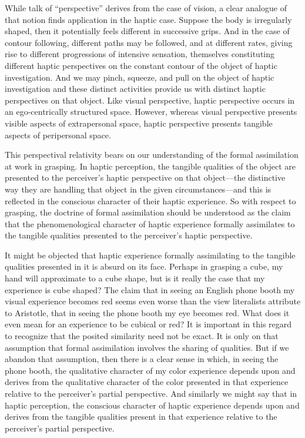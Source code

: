 \documentclass[12pt]{article}
\begin{document}
While talk of ``perspective'' derives from the case of vision, a clear analogue of that notion finds application in the haptic case. Suppose the body is irregularly shaped, then it potentially feels different in successive grips. And in the case of contour following, different paths may be followed, and at different rates, giving rise to different progressions of intensive sensation, themselves constituting different haptic perspectives on the constant contour of the object of haptic investigation. And we may pinch, squeeze, and pull on the object of haptic investigation and these distinct activities provide us with distinct haptic perspectives on that object. Like visual perspective, haptic perspective occurs in an ego-centrically structured space. However, whereas visual perspective presents visible aspects of extrapersonal space, haptic perspective presents tangible aspects of peripersonal space.

This perspectival relativity bears on our understanding of the formal assimilation at work in grasping. In haptic perception, the tangible qualities of the object are presented to the perceiver's haptic perspective on that object---the distinctive way they are handling that object in the given circumstances---and this is reflected in the conscious character of their haptic experience. So with respect to grasping, the doctrine of formal assimilation should be understood as the claim that the phenomenological character of haptic experience formally assimilates to the tangible qualities presented to the perceiver's haptic perspective. 

It might be objected that haptic experience formally assimilating to the tangible qualities presented in it is absurd on its face. Perhaps in grasping a cube, my hand will approximate to a cube shape, but is it really the case that my experience is cube shaped? The claim that in seeing an English phone booth my visual experience becomes red seems even worse than the view literalists attribute to Aristotle, that in seeing the phone booth my eye becomes red. What does it even mean for an experience to be cubical or red? It is important in this regard to recognize that the posited similarity need not be exact. It is only on that assumption that formal assimilation involves the sharing of qualities. But if we abandon that assumption, then there is a clear sense in which, in seeing the phone booth, the qualitative character of my color experience depends upon and derives from the qualitative character of the color presented in that experience relative to the perceiver's partial perspective. And similarly we might say that in haptic perception, the conscious character of haptic experience depends upon and derives from the tangible qualities present in that experience relative to the perceiver's partial perspective. 
\end{document}
